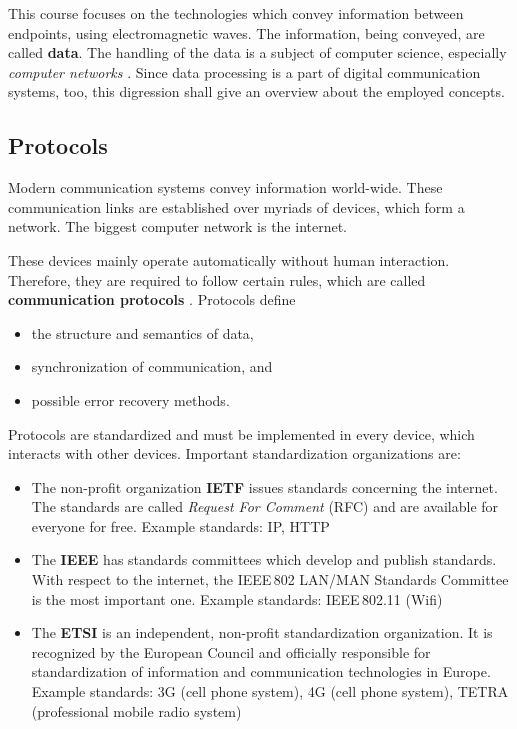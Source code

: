 \begin{refsection}
This course focuses on the technologies which convey information between endpoints, using electromagnetic waves. The information, being conveyed, are called \textbf{data}. The handling of the data is a subject of computer science, especially \emph{computer networks} . Since data processing is a part of digital communication systems, too, this digression shall give an overview about the employed concepts.


\subsection{Protocols}

Modern communication systems convey information world-wide. These communication links are established over myriads of devices, which form a network. The biggest computer network is the internet.

These devices mainly operate automatically without human interaction. Therefore, they are required to follow certain rules, which are called \textbf{communication protocols} . Protocols define
\begin{itemize}
	\item the structure and semantics of data,
	\item synchronization of communication, and
	\item possible error recovery methods.
\end{itemize}

Protocols are standardized and must be implemented in every device, which interacts with other devices. Important standardization organizations are:
\begin{itemize}
	\item The non-profit organization \textbf{\acf{IETF}} issues standards concerning the internet. The standards are called \emph{Request For Comment} (RFC) and are available for everyone for free. Example standards: \ac{IP}, \ac{HTTP}
	\item The \textbf{\acf{IEEE}} has standards committees which develop and publish standards. With respect to the internet, the IEEE\,802 LAN/MAN Standards Committee is the most important one. Example standards: IEEE\,802.11 (Wifi)
	\item The \textbf{\acf{ETSI}} is an independent, non-profit standardization organization. It is recognized by the European Council and officially responsible for standardization of information and communication technologies in Europe. Example standards: 3G (cell phone system), 4G (cell phone system), TETRA (professional mobile radio system)
\end{itemize}



\end{refsection}
